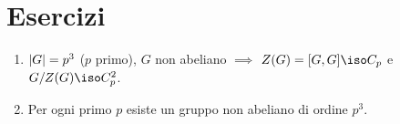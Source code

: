 

\section{Esercizi}

%

\begin{eser}
\begin{enumerate}
\item $\left\lvert G\right\rvert=p^3$ ($p$ primo), $G$ non abeliano $\implies$ $Z(G)=[G,G]\iso C_p$ e $G/Z(G)\iso C_p^2$.
\item Per ogni primo $p$ esiste un gruppo non abeliano di ordine $p^3$.
\end{enumerate}
\end{eser}

